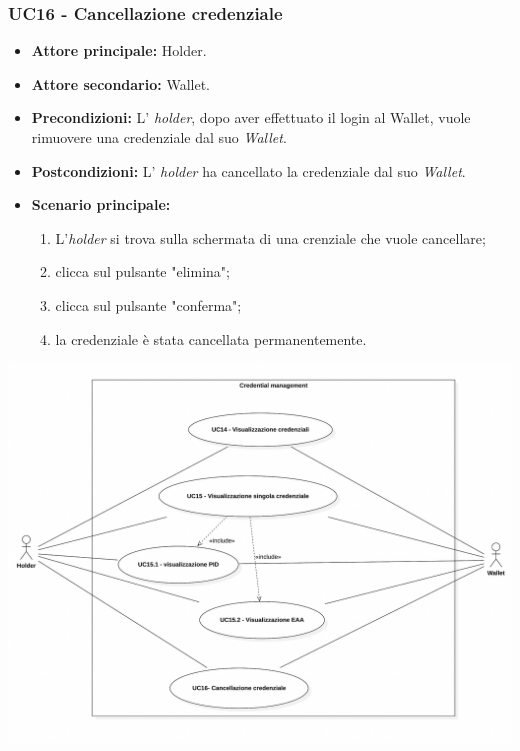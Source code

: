 \subsubsection{UC16 - Cancellazione credenziale}
\begin{itemize}
\item \textbf{Attore principale:} Holder.
\item \textbf{Attore secondario:} Wallet.
\item \textbf{Precondizioni:} L' \textit{holder}, dopo aver effettuato il login al Wallet, vuole rimuovere una credenziale dal suo \textit{Wallet}.
\item \textbf{Postcondizioni:} L' \textit{holder} ha cancellato la credenziale dal suo \textit{Wallet}.
\item \textbf{Scenario principale:} 
    \begin{enumerate}
    \item L'\textit{holder} si trova sulla schermata di una crenziale che vuole cancellare; 
    \item clicca sul pulsante "elimina"; 
    \item clicca sul pulsante "conferma"; 
    \item la credenziale è stata cancellata permanentemente.
    \end{enumerate}
\end{itemize}

\begin{center}
    \includegraphics[scale = 0.5]{./res/img/UC3.PNG}
  \end{center}

